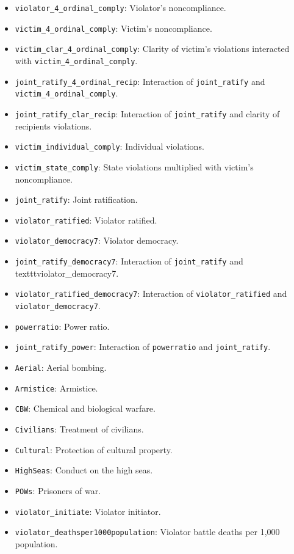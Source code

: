 \documentclass[12pt]{article}
\begin{document}
\begin{itemize}
  \sloppy
  \item \texttt{violator\_4\_ordinal\_comply}: Violator's noncompliance.
  \item \texttt{victim\_4\_ordinal\_comply}: Victim's noncompliance.
  \item \texttt{victim\_clar\_4\_ordinal\_comply}: Clarity of victim's violations interacted with \texttt{victim\_4\_ordinal\_comply}.
  \item \texttt{joint\_ratify\_4\_ordinal\_recip}: Interaction of \texttt{joint\_ratify} and \texttt{victim\_4\_ordinal\_comply}.
  \item \texttt{joint\_ratify\_clar\_recip}: Interaction of \texttt{joint\_ratify} and clarity of recipients violations.
  \item \texttt{victim\_individual\_comply}: Individual violations.
  \item \texttt{victim\_state\_comply}: State violations multiplied with victim's noncompliance.
  \item \texttt{joint\_ratify}: Joint ratification.
  \item \texttt{violator\_ratified}: Violator ratified.
  \item \texttt{violator\_democracy7}: Violator democracy.
  \item \texttt{joint\_ratify\_democracy7}: Interaction of \texttt{joint\_ratify} and texttt{violator\_democracy7}.
  \item \texttt{violator\_ratified\_democracy7}: Interaction of \texttt{violator\_ratified} and \texttt{violator\_democracy7}.
  \item \texttt{powerratio}: Power ratio.
  \item \texttt{joint\_ratify\_power}: Interaction of \texttt{powerratio} and \texttt{joint\_ratify}.
  \item \texttt{Aerial}: Aerial bombing.
  \item \texttt{Armistice}: Armistice.
  \item \texttt{CBW}: Chemical and biological warfare.
  \item \texttt{Civilians}: Treatment of civilians.
  \item \texttt{Cultural}: Protection of cultural property.
  \item \texttt{HighSeas}: Conduct on the high seas.
  \item \texttt{POWs}: Prisoners of war.
  \item \texttt{violator\_initiate}: Violator initiator.
  \item \texttt{violator\_deathsper1000population}: Violator battle deaths per 1,000 population.

\end{itemize}
\end{document}

